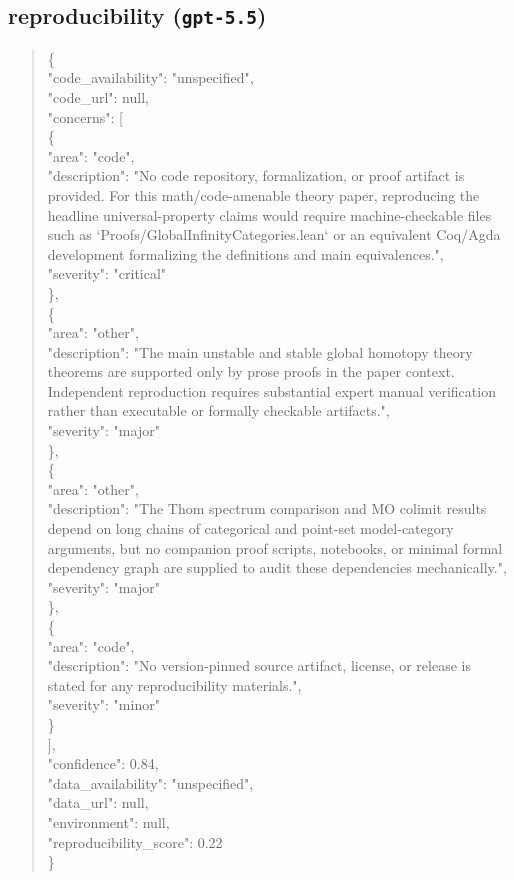 \documentclass[11pt]{article}
\begin{document}
\subsection*{reproducibility (\texttt{gpt-5.5})}
\begin{quote}\small\ttfamily\raggedright
\{\\
  "code\_availability": "unspecified",\\
  "code\_url": null,\\
  "concerns": [\\
    \{\\
      "area": "code",\\
      "description": "No code repository, formalization, or proof artifact is provided. For this math/code-amenable theory paper, reproducing the headline universal-property claims would require machine-checkable files such as `Proofs/GlobalInfinityCategories.lean` or an equivalent Coq/Agda development formalizing the definitions and main equivalences.",\\
      "severity": "critical"\\
    \},\\
    \{\\
      "area": "other",\\
      "description": "The main unstable and stable global homotopy theory theorems are supported only by prose proofs in the paper context. Independent reproduction requires substantial expert manual verification rather than executable or formally checkable artifacts.",\\
      "severity": "major"\\
    \},\\
    \{\\
      "area": "other",\\
      "description": "The Thom spectrum comparison and MO colimit results depend on long chains of categorical and point-set model-category arguments, but no companion proof scripts, notebooks, or minimal formal dependency graph are supplied to audit these dependencies mechanically.",\\
      "severity": "major"\\
    \},\\
    \{\\
      "area": "code",\\
      "description": "No version-pinned source artifact, license, or release is stated for any reproducibility materials.",\\
      "severity": "minor"\\
    \}\\
  ],\\
  "confidence": 0.84,\\
  "data\_availability": "unspecified",\\
  "data\_url": null,\\
  "environment": null,\\
  "reproducibility\_score": 0.22\\
\}\\
\end{quote}
\end{document}
